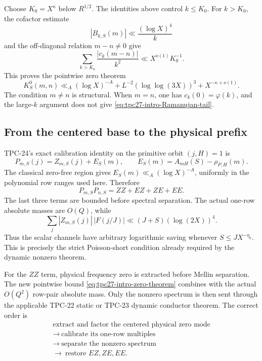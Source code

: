 Choose \(K_0=X^\kappa\) below \(R^{1/2}\).  The identities above
control \(k\le K_0\).  For \(k>K_0\), the cofactor estimate
\begin{equation}
 |B_{k,S}(m)|\ll \frac{(\log X)^4}{k}
 \label{eq:tpc27-intro-large-B}
\end{equation}
and the off-diagonal relation \(m-n\ne0\) give
\begin{equation}
 \sum_{k>K_0}\frac{|c_k(m-n)|}{k^2}
 \ll X^{o(1)}K_0^{-1}.
 \label{eq:tpc27-intro-Ramanujan-tail}
\end{equation}
This proves the pointwise zero theorem
\begin{equation}
 K_S^0(m,n)
 \ll_A(\log X)^{-A}
 +L^{-2}(\log\log(3X))^3+X^{-\kappa+o(1)}.
 \label{eq:tpc27-intro-zero-theorem}
\end{equation}
The condition \(m\ne n\) is structural.  When \(m=n\), one has
\(c_k(0)=\varphi(k)\), and the large-\(k\) argument does not give
\eqref{eq:tpc27-intro-Ramanujan-tail}.

\subsection{From the centered base to the physical prefix}

TPC-24's exact calibration identity on the primitive orbit
\((j,H)=1\) is
\begin{equation}
 P_{m,S}(j)=Z_{m,S}(j)+E_S(m),
 \qquad
 E_S(m)=A_{mH}(S)-\rho_{P,H}(m).
 \label{eq:tpc27-intro-PZE}
\end{equation}
The classical zero-free region gives
\(E_S(m)\ll_A(\log X)^{-A}\), uniformly in the polynomial
row ranges used here.  Therefore
\begin{equation}
 P_{m,S}P_{n,S}
 =ZZ+EZ+ZE+EE.
 \label{eq:tpc27-intro-four-scalar-channels}
\end{equation}
The last three terms are bounded before spectral separation.  The
actual one-row absolute masses are \(O(Q)\), while
\[
 \sum_j|Z_{m,S}(j)|\,|F(j/J)|
 \ll (J+S)(\log(2X))^4.
\]
Thus the scalar channels have arbitrary logarithmic saving whenever
\(S\le JX^{-\eta_0}\).  This is precisely the strict Poisson-short
condition already required by the dynamic nonzero theorem.

For the \(ZZ\) term, physical frequency zero is extracted before
Mellin separation.  The new pointwise bound
\eqref{eq:tpc27-intro-zero-theorem} combines with the actual
\(O(Q^2)\) row-pair absolute mass.  Only the nonzero spectrum is then
sent through the applicable TPC-22 static or TPC-23 dynamic conductor
theorem.  The correct order is
\begin{equation}
 \boxed{
 \begin{gathered}
 \text{extract and factor the centered physical zero mode}\\
 \longrightarrow\ \text{calibrate its one-row multiples}\\
 \longrightarrow\ \text{separate the nonzero spectrum}\\
 \longrightarrow\ \text{restore }EZ,ZE,EE.
 \end{gathered}}
 \label{eq:tpc27-intro-order}
\end{equation}

